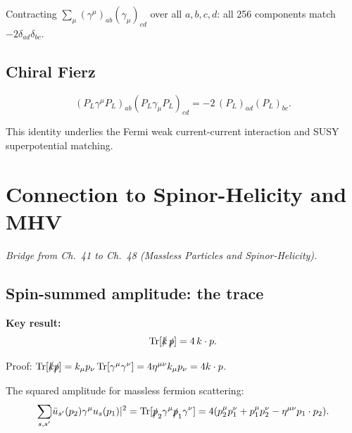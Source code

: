 \begin{mdframed}[backgroundcolor=green!5]
 Contracting $\sum_\mu (\gamma^\mu)_{ab}(\gamma_\mu)_{cd}$
over all $a,b,c,d$: all 256 components match $-2\delta_{ad}\delta_{bc}$. \checkmark
\end{mdframed}

\subsection{Chiral Fierz}

\begin{mdframed}[backgroundcolor=blue!5]
\begin{equation}\label{eq:fierz-LL}
  (P_L\gamma^\mu P_L)_{ab}(P_L\gamma_\mu P_L)_{cd}
  = -2\,(P_L)_{ad}(P_L)_{bc}.
\end{equation}
\end{mdframed}

This identity underlies the Fermi weak current-current interaction and SUSY
superpotential matching.

\section{Connection to Spinor-Helicity and MHV}

\textit{Bridge from Ch.~41 to Ch.~48 (Massless Particles and Spinor-Helicity).}

\subsection{Spin-summed amplitude: the trace}

\begin{mdframed}[backgroundcolor=blue!5]
\textbf{Key result:}
\begin{equation}\label{eq:trace-pp}
  \operatorname{Tr}[\slashed{k}\,\slashed{p}] = 4\,k\cdot p.
\end{equation}
\end{mdframed}

Proof: $\operatorname{Tr}[\slashed{k}\slashed{p}] = k_\mu p_\nu \operatorname{Tr}[\gamma^\mu\gamma^\nu]
= 4\eta^{\mu\nu}k_\mu p_\nu = 4k\cdot p$.

The squared amplitude for massless fermion scattering:
\begin{equation}
  \sum_{s,s'}\!\! |\bar u_{s'}(p_2)\gamma^\mu u_s(p_1)|^2
  = \operatorname{Tr}[\slashed{p}_2\gamma^\mu\slashed{p}_1\gamma^\nu]
  = 4(p_2^\mu p_1^\nu + p_1^\mu p_2^\nu - \eta^{\mu\nu}p_1\cdot p_2).
\end{equation}

